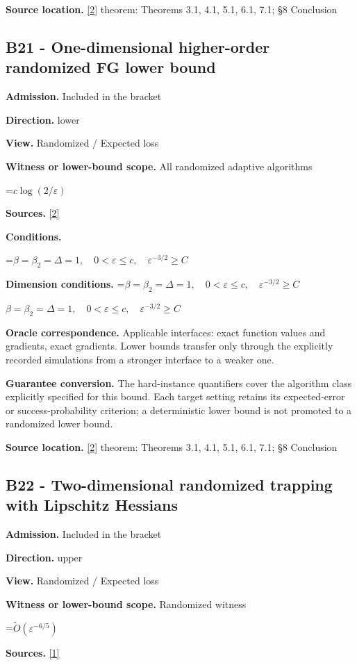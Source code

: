\documentclass[10pt,a4paper]{article}
\newcommand{\AtlasMath}[1]{\par\begingroup\centering\setbox0=\hbox{$\displaystyle #1$}\ifdim\wd0>1.4\linewidth\typeout{ATLAS WIDE FORMULA: \the\wd0}\fi\ifdim\wd0>\linewidth\resizebox{\linewidth}{!}{\box0}\else\box0\fi\par\endgroup}
\newcommand{\AtlasInlineMath}[1]{\begingroup\setbox0=\hbox{$#1$}\ifdim\wd0>.4\linewidth\endgroup\AtlasMath{#1}\else\endgroup$#1$\fi}
\begin{document}
\textbf{Source location.} \href{https://arxiv.org/abs/2610.16295}{[2]} theorem: Theorems 3.1, 4.1, 5.1, 6.1, 7.1; §8 Conclusion

\subsection{B21 - One-dimensional higher-order randomized FG lower bound}
\textbf{Admission.} Included in the bracket

\textbf{Direction.} lower

\textbf{View.} Randomized / Expected loss

\textbf{Witness or lower-bound scope.} All randomized adaptive algorithms

\AtlasMath{c\log(2/\varepsilon)}
\textbf{Sources.} \href{https://arxiv.org/abs/2610.16295}{[2]}

\textbf{Conditions.} 
\AtlasMath{\beta=\beta_2=\Delta=1,\quad0<\varepsilon\le c,\quad\varepsilon^{-3/2}\ge C}


\textbf{Dimension conditions.} \AtlasInlineMath{\beta=\beta_2=\Delta=1,\quad0<\varepsilon\le c,\quad\varepsilon^{-3/2}\ge C}

\textbf{Oracle correspondence.} Applicable interfaces: exact function values and gradients, exact gradients. Lower bounds transfer only through the explicitly recorded simulations from a stronger interface to a weaker one.

\textbf{Guarantee conversion.} The hard-instance quantifiers cover the algorithm class explicitly specified for this bound. Each target setting retains its expected-error or success-probability criterion; a deterministic lower bound is not promoted to a randomized lower bound.

\textbf{Source location.} \href{https://arxiv.org/abs/2610.16295}{[2]} theorem: Theorems 3.1, 4.1, 5.1, 6.1, 7.1; §8 Conclusion

\subsection{B22 - Two-dimensional randomized trapping with Lipschitz Hessians}
\textbf{Admission.} Included in the bracket

\textbf{Direction.} upper

\textbf{View.} Randomized / Expected loss

\textbf{Witness or lower-bound scope.} Randomized witness

\AtlasMath{\widetilde{O}(\varepsilon^{-6/5})}
\textbf{Sources.} \href{https://arxiv.org/pdf/2610.02791}{[1]}
\end{document}
